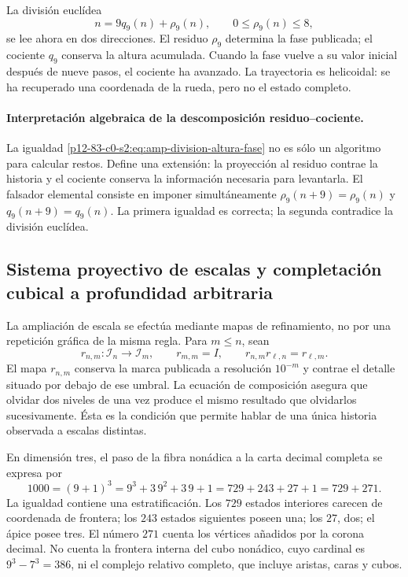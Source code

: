 La división euclídea
\begin{equation}\label{p12-83-c0-s2:eq:amp-division-altura-fase}
 n=9q_9(n)+\rho_9(n),
 \qquad 0\leq\rho_9(n)\leq8,
\end{equation}
se lee ahora en dos direcciones. El residuo \(\rho_9\) determina la fase
publicada; el cociente \(q_9\) conserva la altura acumulada. Cuando la fase
vuelve a su valor inicial después de nueve pasos, el cociente ha avanzado.
La trayectoria es helicoidal: se ha recuperado una coordenada de la rueda,
pero no el estado completo.

\paragraph{Interpretación algebraica de la descomposición residuo–cociente.}
La igualdad \eqref{p12-83-c0-s2:eq:amp-division-altura-fase} no es sólo un algoritmo para
calcular restos. Define una extensión: la proyección al residuo contrae la
historia y el cociente conserva la información necesaria para levantarla.
El falsador elemental consiste en imponer simultáneamente
\(\rho_9(n+9)=\rho_9(n)\) y \(q_9(n+9)=q_9(n)\). La primera igualdad es
correcta; la segunda contradice la división euclídea.

\subsection{Sistema proyectivo de escalas y completación cubical a profundidad arbitraria}

La ampliación de escala se efectúa mediante mapas de refinamiento, no por una
repetición gráfica de la misma regla. Para \(m\leq n\), sean
\begin{equation}\label{p12-83-c0-s2:eq:amp-refinamiento-escalas}
 r_{n,m}:\mathcal I_n\longrightarrow\mathcal I_m,
 \qquad
 r_{m,m}=I,
 \qquad
 r_{n,m}r_{\ell,n}=r_{\ell,m}.
\end{equation}
El mapa \(r_{n,m}\) conserva la marca publicada a resolución \(10^{-m}\) y
contrae el detalle situado por debajo de ese umbral. La ecuación de
composición asegura que olvidar dos niveles de una vez produce el mismo
resultado que olvidarlos sucesivamente. Ésta es la condición que permite
hablar de una única historia observada a escalas distintas.

En dimensión tres, el paso de la fibra nonádica a la carta decimal completa
se expresa por
\begin{equation}\label{p12-83-c0-s2:eq:amp-729-271-1000}
 1000=(9+1)^3=9^3+3\,9^2+3\,9+1
 =729+243+27+1=729+271.
\end{equation}
La igualdad contiene una estratificación. Los \(729\) estados interiores
carecen de coordenada de frontera; los \(243\) estados siguientes poseen una;
los \(27\), dos; el ápice posee tres. El número \(271\) cuenta los vértices
añadidos por la corona decimal. No cuenta la frontera interna del cubo
nonádico, cuyo cardinal es \(9^3-7^3=386\), ni el complejo relativo completo,
que incluye aristas, caras y cubos.

